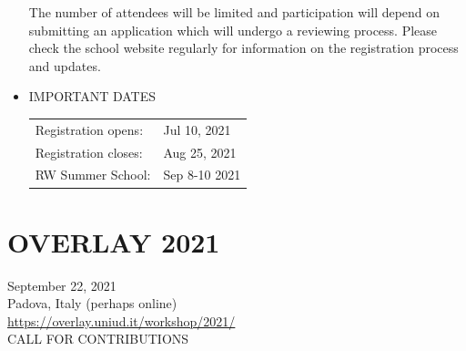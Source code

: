 \documentclass[prodmode,acmtecs]{acmsmall} %
\begin{document}
\begin{itemize}
  The number of attendees will be limited and participation will depend on submitting an application which will undergo a reviewing process. Please check the school website regularly for information on the registration process and updates. 
 
\item  IMPORTANT DATES  
 
\begin{tabulary}{\linewidth}{LL}Registration opens:  & Jul 10, 2021 \\
Registration closes:  & Aug 25, 2021 \\
RW Summer School:  & Sep 8-10 2021 \\
\end{tabulary}
 
\end{itemize}\section{OVERLAY 2021}\label{OVERLAY2021}  September 22, 2021\\ 
  Padova, Italy (perhaps online)\\ 
  \href{https://overlay.uniud.it/workshop/2021/}{https://overlay.uniud.it/workshop/2021/}\\ 
CALL FOR CONTRIBUTIONS 
\end{document}
